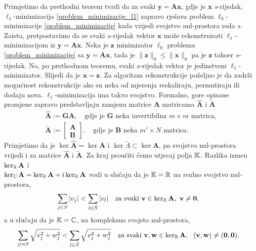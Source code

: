 \documentclass[a4paper,twoside,12pt]{memoir} %
\newcommand{\vect}[1]{\mathbf{#1}}
\renewcommand{\vec}{\vect}
\newcommand{\norm}[1]{\|{#1}\|}
\begin{document}
Primjetimo da prethodni teorem tvrdi da za svaki $\vec y = \vec{Ax}$, gdje je $\vec x$ $s$-rijedak, $\ell_1$-minimizacija \eqref{problem_minimizacije_l1} zapravo rje\v{s}ava problem $\ell_0$-minimizacije \eqref{problem_minimizacije} kada vrijedi svojstvo nul-prostora reda $s$. Zaista, pretpostavimo da se svaki $s$-rijedak vektor $\vec{x}$ mo\v{z}e rekonstruirati $\ell_1$-minimizacijom iz $\vec y = \vec{Ax}$. Neka je $\vec z$ minimizator $\ell_0$ problema \eqref{problem_minimizacije} sa $\vec y = \vec{Ax}$, tada je $\norm{\vec z}_0 \leq \norm{\vec x}_0$ pa je $\vec z$ tako\dj er $s$-rijedak. No, po prethodnom teoremu, svaki $s$-rijedak vektor je jedinstveni $\ell_1$-minimizator. Slijedi da je $\vec x = \vec z$.
\newline \indent
Za algoritam rekonstrukcije po\v{z}eljno je da zadr\v{z}i mogu\'cnost rekonstrukcije ako su neka od mjerenja reskaliraju, permutiraju ili dodaju nova. $\ell_1$-minimizacija ima takvo svojstvo. Formalno, gore opisane promjene zapravo predstavljaju zamjenu matrice $\vec A$ matricama $\vec{\hat A}$ i $\vec{\tilde A}$
\begin{align*}
    & \vec{\hat A} := \vec{GA}, \quad \text{gdje je }\vec{G}\text{ neka invertibilna }m \times m \text{ matrica},\\
    & \vec{\tilde A} := 
    \begin{bmatrix*}
        \vec A \\ \vec B
    \end{bmatrix*}
    , \quad \text{gdje je }\vec{B}\text{ neka }m' \times N \text{ matrica}.
\end{align*}
Primjetimo da je $\ker \vec{\hat A} = \ker \vec A$ i $\ker \tilde A \subset \ker \vec A$, pa svojstvo nul-prostora vrijedi i za matrice $\vec{\hat A}$ i $\vec{\tilde A}$.
\newline
\newline
\indent
Za kraj prou\v{c}iti \'cemo utjecaj polja $\mathbb{K}$. Razlika izme\dj u $\ker_{\R}\vec A$ i\\ $\ker_{\C} \vec A = \ker_{\R} \vec A + i \ker_{\R} \vec A$ vodi u slu\v{c}aju da je $\mathbb{K}=\mathbb{R}$ na realno svojstvo nul-prostora, 
\begin{equation}\label{svojstvo_nul_prostora_realno}
    \sum_{j \in S}|v_j| < \sum_{l \in \bar{S}}|v_l| \quad \text{za svaki } \vec v \in \ker_{\R} \vec A,\ \vec v \neq \vec 0,  
\end{equation}
a u slu\v{c}aju da je $\mathbb{K} = \mathbb{C}$, na kompleksno svojsto nul-prostora,
\begin{equation}\label{svojstvo_nul_prostora_kompleksno}
    \sum_{j in S}\sqrt{v_j^2 + w_j^2} < \sum_{l \in \bar{S}}\sqrt{v_j^2 + w_j^2}\quad \text{za svaki } \vec v, \vec w \in \ker_{\R} \vec A,\ \ ( \vec v, \vec w ) \neq \vec (\vec 0,\vec 0).  
\end{equation}
\end{document}

